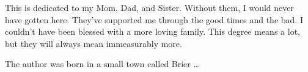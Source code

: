 \begin{abstract}

\lipsum[1-6]


\end{abstract}


\makecopyrightpage

\maketitlepage

\begin{dedication}
This is dedicated to my Mom, Dad, and Sister. Without them, I would never have gotten here. They've supported me through the good times and the bad. I couldn't have been blessed with a more loving family. This degree means a lot, but they will always mean immeasurably more.
\end{dedication}

\begin{biography}
The author was born in a small town called Brier \ldots
\end{biography}

